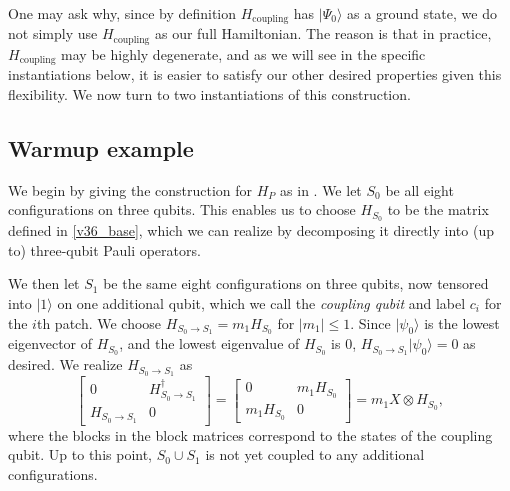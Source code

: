 \documentclass[
  reprint,            %
  amsmath,amssymb,
  aps,
  superscriptaddress, %
  longbibliography
]{revtex4-2}
\theoremstyle{definition}
\begin{document}
One may ask why, since by definition $H_\mathrm{coupling}$ has $|\Psi_0\rangle$ as a ground state, we do not simply use $H_\mathrm{coupling}$ as our full Hamiltonian.
The reason is that in practice, $H_\mathrm{coupling}$ may be highly degenerate, and as we will see in the specific instantiations below, it is easier to satisfy our other desired properties given this flexibility.
We now turn to two instantiations of this construction.


\subsection{Warmup example}
\label{v36}

We begin by giving the construction for $H_P$ as in .
We let $S_0$ be all eight configurations on three qubits.
This enables us to choose $H_{S_0}$ to be the matrix defined in \eqref{v36_base}, which we can realize by decomposing it directly into (up to) three-qubit Pauli operators.

We then let $S_1$ be the same eight configurations on three qubits, now tensored into $|1\rangle$ on one additional qubit, which we call the \emph{coupling qubit} and label $c_i$ for the $i$th patch.
We choose $H_{S_0\rightarrow S_1}=m_1H_{S_0}$ for $|m_1|\le1$.
Since $|\psi_0\rangle$ is the lowest eigenvector of $H_{S_0}$, and the lowest eigenvalue of $H_{S_0}$ is $0$, $H_{S_0\rightarrow S_1}|\psi_0\rangle=0$ as desired.
We realize $H_{S_0\rightarrow S_1}$ as
\begin{equation}
    \begin{bmatrix}
        0 & H_{S_0\rightarrow S_1}^\dagger \\
        H_{S_0\rightarrow S_1} & 0
    \end{bmatrix}
    =
    \begin{bmatrix}
        0 & m_1H_{S_0} \\
        m_1H_{S_0} & 0
    \end{bmatrix}
    =
    m_1X\otimes H_{S_0},
\end{equation}
where the blocks in the block matrices correspond to the states of the coupling qubit.
Up to this point, $S_0\cup S_1$ is not yet coupled to any additional configurations.
\end{document}

